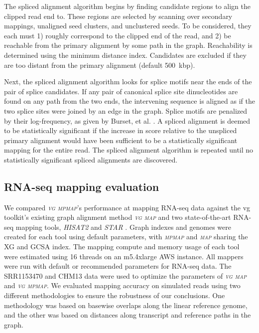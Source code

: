 \documentclass[11pt]{ucthesis}
\newcommand{\tool}[1]{\emph{\textsc{#1}}}
\begin{document}
The spliced alignment algorithm begins by finding candidate regions to align the clipped read end to. These regions are selected by scanning over secondary mappings, unaligned seed clusters, and unclustered seeds. To be considered, they each must 1) roughly correspond to the clipped end of the read, and 2) be reachable from the primary alignment by some path in the graph. Reachability is determined using the minimum distance index. Candidates are excluded if they are too distant from the primary alignment (default 500~kbp). 

Next, the spliced alignment algorithm looks for splice motifs near the ends of the pair of splice candidates. If any pair of canonical splice site dinucleotides are found on any path from the two ends, the intervening sequence is aligned as if the two splice sites were joined by an edge in the graph. Splice motifs are penalized by their log-frequency, as given by Burset, et al. \cite{burset2000analysis}. A spliced alignment is deemed to be statistically significant if the increase in score relative to the unspliced primary alignment would have been sufficient to be a statistically significant mapping for the entire read. The spliced alignment algorithm is repeated until no statistically significant spliced alignments are discovered.

\subsection{RNA-seq mapping evaluation}

We compared \tool{vg mpmap}'s performance at mapping RNA-seq data against the vg toolkit's existing graph alignment method \tool{vg map} \cite{garrison2018variation} and two state-of-the-art RNA-seq mapping tools, \tool{HISAT2} \cite{kim2019graph} and \tool{STAR} \cite{dobin2013star}. Graph indexes and genomes were created for each tool using default parameters, with \tool{mpmap} and \tool{map} sharing the XG and GCSA index. The mapping compute and memory usage of each tool were estimated using 16 threads on an m5.4xlarge AWS instance. All mappers were run with default or recommended parameters for RNA-seq data. The SRR1153470 and CHM13 data were used to optimize the parameters of \tool{vg map} and \tool{vg mpmap}.  
\newline 
\newline
We evaluated mapping accuracy on simulated reads using two different methodologies to ensure the robustness of our conclusions. One methodology was based on basewise overlaps along the linear reference genome, and the other was based on distances along transcript and reference paths in the graph. 
\end{document}
